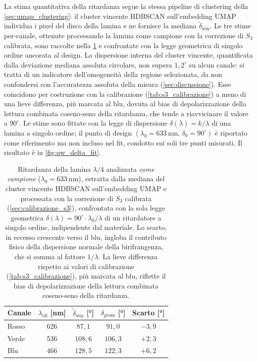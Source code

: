 La stima quantitativa della ritardanza segue la stessa pipeline di clustering della \cref{sec:umap_clustering}: il cluster vincente HDBSCAN sull'embedding UMAP individua i pixel del disco della lamina e ne fornisce la mediana $\tilde\delta_{\mathrm{win}}$. Le tre stime per-canale, ottenute processando la lamina come campione con la correzione di $S_3$ calibrata, sono raccolte nella \cref{tab:qw_ritardanza} e confrontate con la legge geometrica di singolo ordine ancorata al design. La dispersione interna del cluster vincente, quantificata dalla deviazione mediana assoluta circolare, non supera $1{,}2^\circ$ su alcun canale: si tratta di un indicatore dell'omogeneità della regione selezionata, da non confondersi con l'accuratezza assoluta della misura (\cref{sec:discussione}). Esse coincidono per costruzione con la calibrazione (\cref{tab:s3_calibrazione}) a meno di una lieve differenza, più marcata al blu, dovuta al bias di depolarizzazione della lettura combinata coseno-seno della ritardanza, che tende a riavvicinare il valore a $90^\circ$. Le stime sono fittate con la legge di dispersione $\delta(\lambda) = k/\lambda$ di una lamina a singolo ordine; il punto di design $(\lambda_0 = \SI{633}{\nano\meter},\,\delta_0 = 90^\circ)$ è riportato come riferimento ma non incluso nel fit, condotto sui soli tre punti misurati. Il risultato è in \cref{fig:qw_delta_fit}.

\begin{table}[H]
    \centering
    \caption{Ritardanza della lamina $\lambda/4$ analizzata \emph{come campione} ($\lambda_0 = \SI{633}{\nano\meter}$), estratta dalla mediana del cluster vincente HDBSCAN sull'embedding UMAP e processata con la correzione di $S_3$ calibrata (\cref{sec:calibrazione_s3}), confrontata con la sola legge geometrica $\delta(\lambda) = 90^\circ \cdot \lambda_0/\lambda$ di un ritardatore a singolo ordine, indipendente dal materiale. Lo scarto, in eccesso crescente verso il blu, ingloba il contributo fisico della dispersione normale della birifrangenza, che si somma al fattore $1/\lambda$. La lieve differenza rispetto ai valori di calibrazione (\cref{tab:s3_calibrazione}), più marcata al blu, riflette il bias di depolarizzazione della lettura combinata coseno-seno della ritardanza.}
    \label{tab:qw_ritardanza}
    \begin{tabular}{lcccc}
        \hline
        \textbf{Canale} & $\lambda_\mathrm{eff}$ [\si{\nano\meter}] & $\tilde\delta_\mathrm{win}$ [\si{\degree}] & $\delta_\mathrm{geom}$ [\si{\degree}] & Scarto [\si{\degree}] \\
        \hline
        Rosso & 626 & $87{,}1$  & $91{,}0$  & $-3{,}9$ \\
        Verde & 536 & $108{,}6$ & $106{,}3$ & $+2{,}3$ \\
        Blu   & 466 & $128{,}5$ & $122{,}3$ & $+6{,}2$ \\
        \hline
    \end{tabular}
\end{table}

